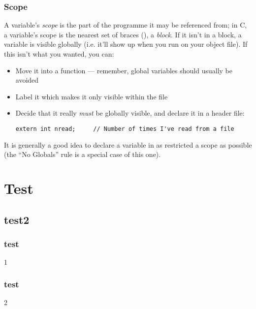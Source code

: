 \documentclass[10pt, t]{beamer}
\begin{document}
\begin{frame}[fragile]
\frametitle{Scope}
\label{sec-1-1-5}

A variable's \emph{scope} is the part of the programme it may be referenced from;  in C, a variable's scope
is the nearest set of braces (\code{\{\}}), a \emph{block}.  If it isn't in a block, a variable is visible globally
(i.e. it'll show up when you run  on your object file).  If this isn't what you wanted, you can:
 \pause
\begin{itemize}
\item Move it into a function --- remember, global variables should usually be avoided
\end{itemize}
 \pause
\begin{itemize}
\item Label it  which makes it only visible within the file
\end{itemize}
 \pause
\begin{itemize}
\item Decide that it really \emph{must} be globally visible, and declare it in a header file:

\begin{verbatim}
extern int nread;     // Number of times I've read from a file
\end{verbatim}
\end{itemize}

\pause
It is generally a good idea to declare a variable in as restricted a scope as possible (the ``No Globals'' rule
is a special case of this one).
\end{frame}
\section{Test}
\label{sec-2}
\subsection{test2}
\label{sec-2-1}
\begin{frame}
\frametitle{test}
\label{sec-2-1-1}

1
\end{frame}
\begin{frame}
\frametitle{test}
\label{sec-2-1-2}

2
\end{frame}
\end{document}
